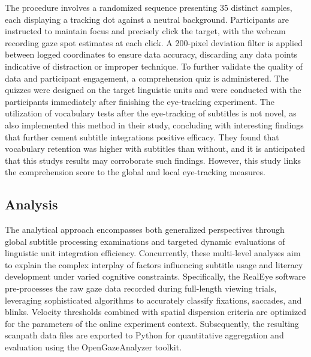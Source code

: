 The procedure involves a randomized sequence presenting 35 distinct
samples, each displaying a tracking dot against a neutral background.
Participants are instructed to maintain focus and precisely click the
target, with the webcam recording gaze spot estimates at each click. A
200-pixel deviation filter is applied between logged coordinates to
ensure data accuracy, discarding any data points indicative of
distraction or improper technique. To further validate the quality of
data and participant engagement, a comprehension quiz is administered.
The quizzes were designed on the target linguistic units and were
conducted with the participants immediately after finishing the
eye-tracking experiment. The utilization of vocabulary tests after the
eye-tracking of subtitles is not novel, as \textcite{bisson2014} also
implemented this method in their study, concluding with interesting
findings that further cement subtitle integration\textquotesingle s
positive efficacy. They found that vocabulary retention was higher with
subtitles than without, and it is anticipated that this
study\textquotesingle s results may corroborate such findings. However,
this study links the comprehension score to the global and local
eye-tracking measures.

\subsection{Analysis}\label{sub-sec-analysis}

The analytical approach encompasses both generalized perspectives
through global subtitle processing examinations and targeted dynamic
evaluations of linguistic unit integration efficiency. Concurrently,
these multi-level analyses aim to explain the complex interplay of
factors influencing subtitle usage and literacy development under varied
cognitive constraints. Specifically, the RealEye software pre-processes
the raw gaze data recorded during full-length viewing trials, leveraging
sophisticated algorithms to accurately classify fixations, saccades, and
blinks. Velocity thresholds combined with spatial dispersion criteria
are optimized for the parameters of the online experiment context.
Subsequently, the resulting scanpath data files are exported to Python
for quantitative aggregation and evaluation using the OpenGazeAnalyzer
toolkit.

